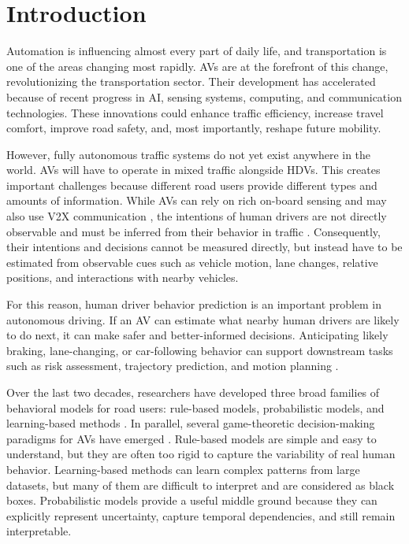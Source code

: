 \chapter{Introduction}

Automation is influencing almost every part of daily life, and transportation is one of the areas changing most rapidly. 
\acp{AV} are at the forefront of this change, revolutionizing the transportation sector. Their development has accelerated because of recent progress in \ac{AI}, 
sensing systems, computing, and communication technologies. These innovations could enhance traffic efficiency, increase travel comfort, improve road
safety, and, most importantly, reshape future mobility.

\par However, fully autonomous traffic systems do not yet exist anywhere in the world. \acp{AV} will have to operate in mixed traffic alongside  
\acp{HDV}. This creates important challenges because different road users provide different types and amounts of information. 
While \acp{AV} can rely on
rich on-board sensing and may also use \ac{V2X} communication \cite{abedi2025precisehdvpositioningsafetyaware}, 
the intentions of human drivers are not directly observable and must be inferred from their behavior in traffic \cite{Schwarting2018}. 
Consequently, their intentions and decisions cannot be measured directly,  
but instead have to be estimated from observable cues such as vehicle motion, lane changes, relative positions, and interactions with nearby vehicles.

\par For this reason, human driver behavior prediction is an important problem in autonomous driving. If an \ac{AV} can estimate what nearby human drivers are likely to do next, 
it can make safer and better-informed decisions. Anticipating likely braking, lane-changing, or car-following behavior can support downstream tasks such as risk 
assessment, trajectory prediction, and motion planning \cite{Lefevre2014,Madjid_2026,Schwarting2018}.

\par Over the last two decades, researchers have developed three broad families of behavioral
models for road users: rule-based models, probabilistic models, and learning-based methods \cite{10054035,Rudenko_2020,Lefevre2014}.
In parallel, several game-theoretic decision-making paradigms for \acp{AV} have emerged \cite{automotiveinnovation}. Rule-based models are simple and easy to understand, 
but they are often too rigid to capture the variability of real human behavior. Learning-based methods can learn complex patterns from large datasets, but many of them 
are difficult to interpret and are considered as black boxes. 
Probabilistic models provide a useful middle ground because they can explicitly represent uncertainty, capture temporal dependencies, and still remain interpretable.

